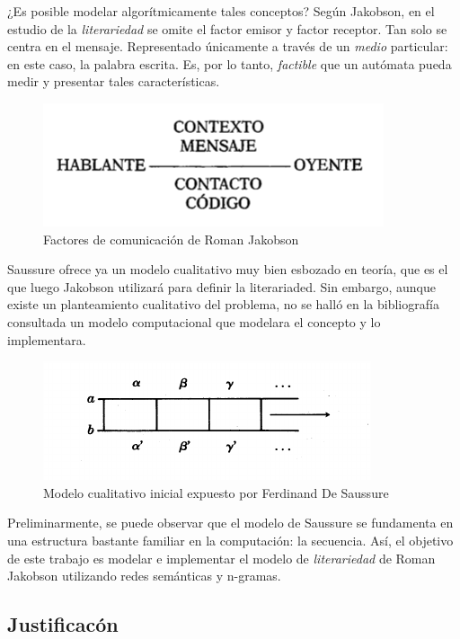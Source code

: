 \documentclass[twoside]{article}
\begin{document}
¿Es posible  modelar algorítmicamente  tales conceptos? Según
Jakobson, en el estudio de la \emph{literariedad} se omite el factor emisor
y factor receptor. Tan solo se centra en el mensaje. Representado
 únicamente a través de un \emph{medio} particular: en este caso, la palabra escrita.
Es, por lo tanto,  \emph{factible} que un autómata pueda medir y presentar tales
características. 

\begin{figure}[htbp]
\centering
\includegraphics[width=.9\linewidth]{./assets/factores_comunicacion.png}
\caption{Factores de comunicación de Roman Jakobson}
\end{figure}

Saussure ofrece ya un modelo cualitativo muy bien esbozado en teoría,
que es el que luego Jakobson utilizará para definir la literariaded.
Sin embargo, aunque existe un planteamiento cualitativo del problema,
no se halló en la bibliografía consultada un modelo computacional que
modelara el concepto y lo implementara. 

\begin{figure}[htbp]
\centering
\includegraphics[width=.9\linewidth]{./assets/delimitacion_saussure.png}
\caption{Modelo cualitativo inicial expuesto por Ferdinand De Saussure}
\end{figure}
Preliminarmente, se puede observar que el modelo de Saussure se
fundamenta en una estructura bastante familiar en la computación: la
secuencia. Así, el objetivo de este trabajo es modelar e implementar el
modelo de \emph{literariedad} de Roman Jakobson utilizando redes semánticas
y n-gramas.


\subsection{Justificacón}
\label{sec:orgabc53da}
\end{document}

